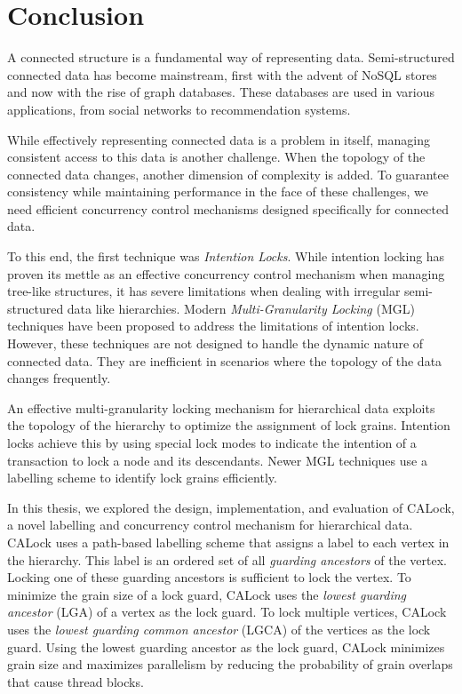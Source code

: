 %

\chapter{Conclusion} \label{chap:conclusion}
\minitoc

A connected structure is a fundamental way of representing data. Semi-structured connected data has become mainstream, first with the advent of NoSQL stores and now with the rise of graph databases. These databases are used in various applications, from social networks to recommendation systems. 

While effectively representing connected data is a problem in itself, managing consistent access to this data is another challenge. When the topology of the connected data changes, another dimension of complexity is added. To guarantee consistency while maintaining performance in the face of these challenges, we need efficient concurrency control mechanisms designed specifically for connected data.

To this end, the first technique was \emph{Intention Locks}. While intention locking has proven its mettle as an effective concurrency control mechanism when managing tree-like structures, it has severe limitations when dealing with irregular semi-structured data like hierarchies. Modern \emph{Multi-Granularity Locking} (MGL) techniques have been proposed to address the limitations of intention locks. However, these techniques are not designed to handle the dynamic nature of connected data. They are inefficient in scenarios where the topology of the data changes frequently.

An effective multi-granularity locking mechanism for hierarchical data exploits the topology of the hierarchy to optimize the assignment of lock grains. Intention locks achieve this by using special lock modes to indicate the intention of a transaction to lock a node and its descendants. Newer MGL techniques use a labelling scheme to identify lock grains efficiently.  

In this thesis, we explored the design, implementation, and evaluation of CALock, a novel labelling and concurrency control mechanism for hierarchical data. CALock uses a path-based labelling scheme that assigns a label to each vertex in the hierarchy. This label is an ordered set of all \emph{guarding ancestors} of the vertex. Locking one of these guarding ancestors is sufficient to lock the vertex. To minimize the grain size of a lock guard, CALock uses the \emph{lowest guarding ancestor} (LGA) of a vertex as the lock guard. To lock multiple vertices, CALock uses the \emph{lowest guarding common ancestor} (LGCA) of the vertices as the lock guard. Using the lowest guarding ancestor as the lock guard, CALock minimizes grain size and maximizes parallelism by reducing the probability of grain overlaps that cause thread blocks.




